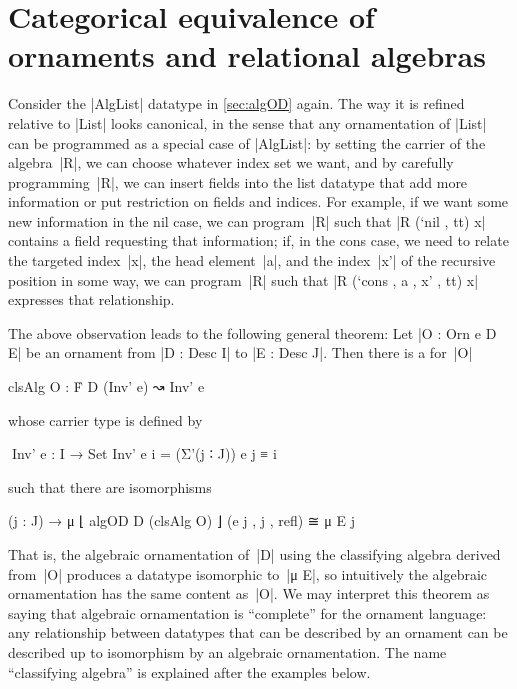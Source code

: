 \chapter{Categorical equivalence of ornaments and relational algebras}
\label{chap:equivalence}

Consider the |AlgList| datatype in \autoref{sec:algOD} again.
The way it is refined relative to |List| looks canonical, in the sense that any ornamentation of |List| can be programmed as a special case of |AlgList|:
by setting the carrier of the algebra~|R|, we can choose whatever index set we want, and by carefully programming~|R|, we can insert fields into the list datatype that add more information or put restriction on fields and indices.
For example, if we want some new information in the nil case, we can program~|R| such that |R (`nil , tt) x| contains a field requesting that information; if, in the cons case, we need to relate the targeted index~|x|, the head element~|a|, and the index~|x'| of the recursive position in some way, we can program~|R| such that |R (`cons , a , x' , tt) x| expresses that relationship.

The above observation leads to the following general theorem:
Let |O : Orn e D E| be an ornament from |D : Desc I| to |E : Desc J|.
Then there is a  for~|O|
\begin{code}
clsAlg O : Ḟ D (Inv' e) ↝ Inv' e
\end{code}
whose carrier type is defined by
\begin{code}
^^^Inv' e : I → Set
Inv' e i = (Σ'(j ∶ J)) e j ≡ i
\end{code}
such that there are isomorphisms
\begin{code}
(j : J) → μ ⌊ algOD D (clsAlg O) ⌋ (e j , j , refl) ≅ μ E j
\end{code}
That is, the algebraic ornamentation of~|D| using the classifying algebra derived from~|O| produces a datatype isomorphic to~|μ E|, so intuitively the algebraic ornamentation has the same content as~|O|.
We may interpret this theorem as saying that algebraic ornamentation is ``complete'' for the ornament language: any relationship between datatypes that can be described by an ornament can be described up to isomorphism by an algebraic ornamentation.
The name ``classifying algebra'' is explained after the examples below.

